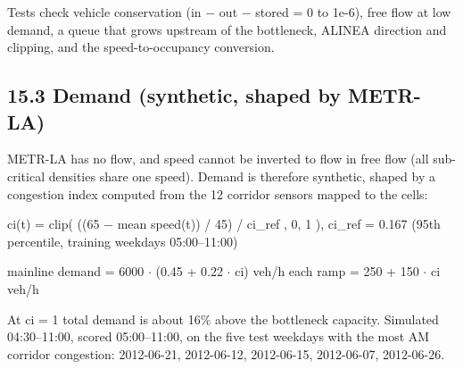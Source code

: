 \documentclass[10pt,a4paper]{article}
\begin{document}
Tests check vehicle conservation (in \ensuremath{-} out \ensuremath{-} stored = 0 to 1e-6), free flow at low demand, a queue that grows upstream of the bottleneck, ALINEA direction and clipping, and the speed-to-occupancy conversion.

\subsection*{15.3 Demand (synthetic, shaped by METR-LA)}
METR-LA has no flow, and speed cannot be inverted to flow in free flow (all sub-critical densities share one speed). Demand is therefore synthetic, shaped by a congestion index computed from the 12 corridor sensors mapped to the cells:

\begin{eqbox}ci(t) = clip( ((65 \ensuremath{-} mean speed(t)) /\allowbreak{} 45) /\allowbreak{} ci\_\allowbreak{}ref , 0, 1 ),   ci\_\allowbreak{}ref = 0.167 (95th percentile, training weekdays 05:00--11:00)\end{eqbox}

\begin{eqbox}mainline demand = 6000 \ensuremath{\cdot} (0.45 + 0.22 \ensuremath{\cdot} ci) veh/\allowbreak{}h        each ramp = 250 + 150 \ensuremath{\cdot} ci veh/\allowbreak{}h\end{eqbox}

At ci = 1 total demand is about 16\% above the bottleneck capacity. Simulated 04:30--11:00, scored 05:00--11:00, on the five test weekdays with the most AM corridor congestion: 2012-06-21, 2012-06-12, 2012-06-15, 2012-06-07, 2012-06-26.
\end{document}
